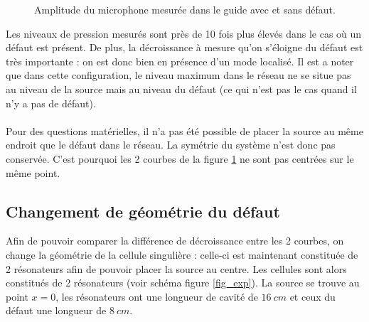 \begin{figure}[!h]
\begin{minipage}[r]{0.5 \textwidth}
		\caption{Amplitude du microphone mesurée dans le guide avec et sans défaut.\label{p_tube}}
	\end{minipage}
\end{figure}

Les niveaux de pression mesurés sont près de 10 fois plus élevés dans le cas où un défaut est présent. De plus, la décroissance à mesure qu'on s'éloigne du défaut est très importante : on est donc bien en présence d'un mode localisé. Il est a noter que dans cette configuration, le niveau maximum dans le réseau ne se situe pas au niveau de la source mais au niveau du défaut (ce qui n'est pas le cas quand il n'y a pas de défaut).\\~\\


Pour des questions matérielles, il n'a pas été possible de placer la source au même endroit que le défaut dans le réseau. La symétrie du système n'est donc pas conservée. C'est pourquoi les 2 courbes de la figure \ref{p_tube} ne sont pas centrées sur le même point.

\subsection{Changement de géométrie du défaut}
Afin de pouvoir comparer la différence de décroissance entre les 2 courbes, on change la géométrie de la cellule singulière : celle-ci est maintenant constituée de 2 résonateurs afin de pouvoir placer la source au centre. Les cellules sont alors constitués de 2 résonateurs (voir schéma figure \ref{fig_exp}). La source se trouve au point $x=0$, les résonateurs ont une longueur de cavité de $16~cm$ et ceux du défaut une longueur de $8~cm$.


